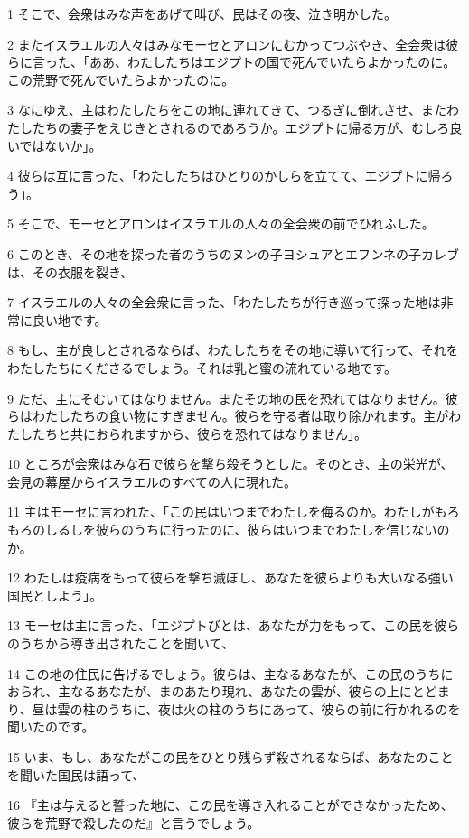 \par 1 そこで、会衆はみな声をあげて叫び、民はその夜、泣き明かした。
\par 2 またイスラエルの人々はみなモーセとアロンにむかってつぶやき、全会衆は彼らに言った、「ああ、わたしたちはエジプトの国で死んでいたらよかったのに。この荒野で死んでいたらよかったのに。
\par 3 なにゆえ、主はわたしたちをこの地に連れてきて、つるぎに倒れさせ、またわたしたちの妻子をえじきとされるのであろうか。エジプトに帰る方が、むしろ良いではないか」。
\par 4 彼らは互に言った、「わたしたちはひとりのかしらを立てて、エジプトに帰ろう」。
\par 5 そこで、モーセとアロンはイスラエルの人々の全会衆の前でひれふした。
\par 6 このとき、その地を探った者のうちのヌンの子ヨシュアとエフンネの子カレブは、その衣服を裂き、
\par 7 イスラエルの人々の全会衆に言った、「わたしたちが行き巡って探った地は非常に良い地です。
\par 8 もし、主が良しとされるならば、わたしたちをその地に導いて行って、それをわたしたちにくださるでしょう。それは乳と蜜の流れている地です。
\par 9 ただ、主にそむいてはなりません。またその地の民を恐れてはなりません。彼らはわたしたちの食い物にすぎません。彼らを守る者は取り除かれます。主がわたしたちと共におられますから、彼らを恐れてはなりません」。
\par 10 ところが会衆はみな石で彼らを撃ち殺そうとした。そのとき、主の栄光が、会見の幕屋からイスラエルのすべての人に現れた。
\par 11 主はモーセに言われた、「この民はいつまでわたしを侮るのか。わたしがもろもろのしるしを彼らのうちに行ったのに、彼らはいつまでわたしを信じないのか。
\par 12 わたしは疫病をもって彼らを撃ち滅ぼし、あなたを彼らよりも大いなる強い国民としよう」。
\par 13 モーセは主に言った、「エジプトびとは、あなたが力をもって、この民を彼らのうちから導き出されたことを聞いて、
\par 14 この地の住民に告げるでしょう。彼らは、主なるあなたが、この民のうちにおられ、主なるあなたが、まのあたり現れ、あなたの雲が、彼らの上にとどまり、昼は雲の柱のうちに、夜は火の柱のうちにあって、彼らの前に行かれるのを聞いたのです。
\par 15 いま、もし、あなたがこの民をひとり残らず殺されるならば、あなたのことを聞いた国民は語って、
\par 16 『主は与えると誓った地に、この民を導き入れることができなかったため、彼らを荒野で殺したのだ』と言うでしょう。
